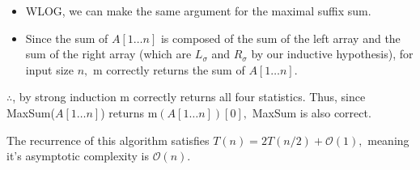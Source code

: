 \documentclass[12pt]{article}
\begin{document}
\begin{enumerate}
\begin{itemize}
        In both cases, input size $n$ returns the correct maximal
        prefix of $A[1 \ldots n].$

      \item WLOG, we can make the same argument for the maximal suffix sum.

      \item Since the sum of $A[1 \ldots n]$ is composed of the sum
        of the left array and the sum of the right array (which are
        $L_\sigma$ and $R_\sigma$ by our inductive hypothesis), for
        input size $n,$ m correctly returns the sum of $A[1 \ldots n].$
    \end{itemize}

    $\therefore$, by strong induction m correctly returns all four
    statistics. Thus, since MaxSum($A[1 \ldots n]$) returns m$(A[1
    \ldots n])[0],$ MaxSum is also correct.

    The recurrence of this algorithm satisfies $T(n) = 2T(n/2) +
    \mathcal O(1),$ meaning it's asymptotic complexity is $\mathcal O(n).$
\end{enumerate}
\end{document}
